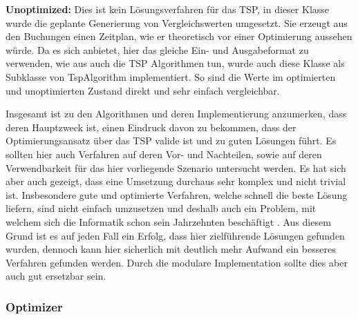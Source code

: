 \textbf{Unoptimized:} Dies ist kein Lösungsverfahren für das TSP, in dieser Klasse wurde die geplante Generierung von Vergleichswerten umgesetzt. Sie erzeugt aus den Buchungen einen Zeitplan, wie er theoretisch vor einer Optimierung aussehen würde. Da es sich anbietet, hier das gleiche Ein- und Ausgabeformat zu verwenden, wie aus auch die TSP Algorithmen tun, wurde auch diese Klasse als Subklasse von TspAlgorithm implementiert. So sind die Werte im optimierten und unoptimierten Zustand direkt und sehr einfach vergleichbar.

Insgesamt ist zu den Algorithmen und deren Implementierung anzumerken, dass deren Hauptzweck ist, einen Eindruck davon zu bekommen, dass der Optimierungsansatz über das TSP valide ist und zu guten Lösungen führt. Es sollten hier auch Verfahren auf deren Vor- und Nachteilen, sowie auf deren Verwendbarkeit für das hier vorliegende Szenario untersucht werden. Es hat sich aber auch gezeigt, dass eine Umsetzung durchaus sehr komplex und nicht trivial ist. Insbesondere gute und optimierte Verfahren, welche schnell die beste Lösung liefern, sind nicht einfach umzusetzen und deshalb auch ein Problem, mit welchem sich die Informatik schon sein Jahrzehnten beschäftigt \cite{travelingSalesman}. Aus diesem Grund ist es auf jeden Fall ein Erfolg, dass hier zielführende Lösungen gefunden wurden, dennoch kann hier sicherlich mit deutlich mehr Aufwand ein besseres Verfahren gefunden werden. Durch die modulare Implementation sollte dies aber auch gut ersetzbar sein.

\subsubsection{Optimizer}


